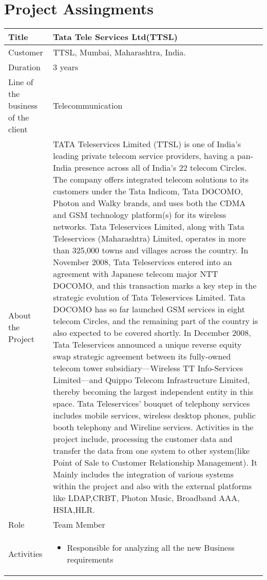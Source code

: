 \documentclass{article}
\begin{document}
\renewcommand{\arraystretch}{2.5}
\section{Project Assingments}
\begin{tabular}{ |p{3cm}|p{11.5cm}|}
\hline
Title & Tata Tele Services Ltd(TTSL) \\
\hline
Customer & TTSL, Mumbai, Maharashtra, India. \\
\hline
Duration & 3 years \\
\hline
Line of the business of the client & Telecommunication \\
\hline
About the Project & TATA Teleservices Limited (TTSL) is one of India’s leading private telecom service providers, having a pan-India presence across all of India’s 22 telecom Circles. The company offers integrated telecom solutions to its customers under the Tata Indicom, Tata DOCOMO, Photon and Walky brands, and uses both the CDMA and GSM technology platform(s) for its wireless networks. Tata Teleservices Limited, along with Tata Teleservices (Maharashtra) Limited, operates in more than 325,000 towns and villages across the country. In November 2008, Tata Teleservices entered into an agreement with Japanese telecom major NTT DOCOMO, and this transaction marks a key step in the strategic evolution of Tata Teleservices Limited. Tata DOCOMO has so far launched GSM services in eight telecom Circles, and the remaining part of the country is also expected to be covered shortly. In December 2008, Tata Teleservices announced a unique reverse equity swap strategic agreement between its fully-owned telecom tower subsidiary—Wireless TT Info-Services Limited—and Quippo Telecom Infrastructure Limited, thereby becoming the largest independent entity in this space. Tata Teleservices’ bouquet of telephony services includes mobile services, wireless desktop phones, public booth telephony and Wireline services. Activities in the project include, processing the customer data and transfer the data from one system to other system(like Point of Sale to Customer Relationship Management). It Mainly includes the integration of various systems within the project and also with the external platforms like LDAP,CRBT, Photon Music, Broadband AAA, HSIA,HLR. \\
\hline
Role & Team Member \\
\hline
Activities &
\begin{itemize}
\item Responsible for analyzing all the new Business requirements

\end{itemize}
\end{tabular}
\end{document}
